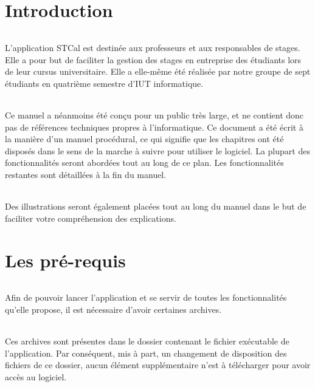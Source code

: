 \documentclass[a4paper,10pt]{report}
\begin{document}
\strut
\renewcommand{\contentsname}{Sommaire}
\tableofcontents

\part{Introduction}
  \paragraph{}
    L'application STCal est destinée aux professeurs et aux responsables de stages.
    Elle a pour but de faciliter la gestion des stages en entreprise des étudiants lors de leur cursus universitaire.
    Elle a elle-même été réalisée par notre groupe de sept étudiants en quatrième semestre d'IUT informatique.
    
  \paragraph{}
    Ce manuel a néanmoins été conçu pour un public très large, et ne contient donc pas de références techniques propres à l'informatique.
    Ce document a été écrit à la manière d'un manuel procédural, ce qui signifie que les chapitres ont été disposés dans le sens de la marche à suivre pour utiliser le logiciel.
    La plupart des fonctionnalités seront abordées tout au long de ce plan.
    Les fonctionnalités restantes sont détaillées à la fin du manuel.
  
  \paragraph{}
     Des illustrations seront également placées tout au long du manuel dans le but de faciliter votre compréhension des explications.
    

\part{Les pré-requis}
  \paragraph{}
    Afin de pouvoir lancer l'application et se servir de toutes les fonctionnalités qu'elle propose, il est nécessaire d'avoir certaines archives.
    
  \paragraph{}
    Ces archives sont présentes dans le dossier contenant le fichier exécutable de l'application. 
    Par conséquent, mis à part, un changement de disposition des fichiers de ce dossier, aucun élément supplémentaire n'est à télécharger pour avoir accès au logiciel.
\end{document}

